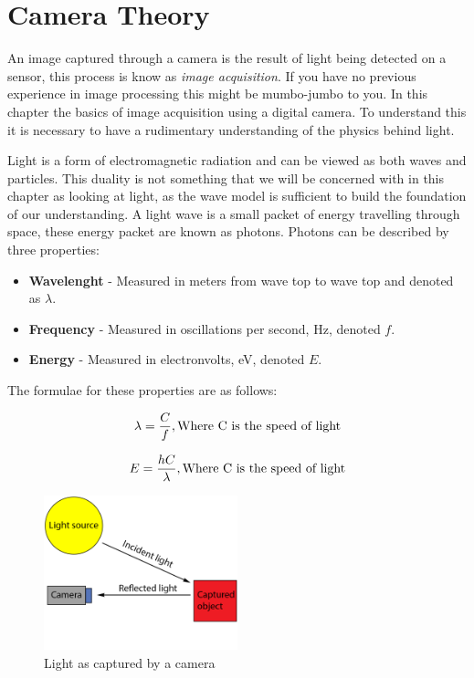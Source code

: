 \section{Camera Theory}

An image captured through a camera is the result of light being detected on a sensor, this process is know as \textit{image acquisition}. If you have no previous experience in image processing this might be mumbo-jumbo to you. In this chapter the basics of image acquisition using a digital camera. To understand this it is necessary to have a rudimentary understanding of the physics behind light.

Light is a form of electromagnetic radiation and can be viewed as both waves and particles. This duality is not something that we will be concerned with in this chapter as looking at light, as the wave model is sufficient to build the foundation of our understanding. A light wave is a small packet of energy travelling through space, these energy packet are known as photons. Photons can be described by three properties:

\begin{itemize}
\item \textbf{Wavelenght} - Measured in meters from wave top to wave top and denoted as $\lambda$.
\item \textbf{Frequency} - Measured in oscillations per second, Hz, denoted $f$.
\item \textbf{Energy} - Measured in electronvolts, eV, denoted $E$.
\end{itemize}

The formulae for these properties are as follows:

\begin{align}
\centering 
\lambda = \frac{C}{f}, \text{Where C is the speed of light}
\numberwithin{equation}{section}
\label{eq:wavelenght} 
\end{align}

\begin{align}
\centering
E = \frac{hC}{\lambda}, \text{Where C is the speed of light}
\numberwithin{equation}{section}
\label{eq:e_v} 
\end{align}

\begin{figure}[htbp] 
\centering 
\includegraphics[width=0.5\textwidth]{Pictures/Theory/light_from_sun.png} 
\caption{Light as captured by a camera} 
\label{fig:light_cam} 
\end{figure} 


